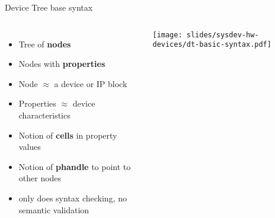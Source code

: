 \begin{frame}{Device Tree base syntax}
  \begin{columns}[T]
    \begin{itemize}
    \item Tree of {\bf nodes}
    \item Nodes with {\bf properties}
    \item Node $\approx$ a device or IP block
    \item Properties $\approx$ device characteristics
    \item Notion of {\bf cells} in property values
    \item Notion of {\bf phandle} to point to other nodes
    \item {} only does syntax checking, no semantic validation
    \end{itemize}
    \begin{center}
      \texttt{[image: slides/sysdev-hw-devices/dt-basic-syntax.pdf]}
    \end{center}
  \end{columns}
\end{frame}


